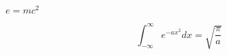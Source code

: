 \documentclass[10pt]{book}
\begin{document}
\begin{mdSnippets}
\begin{mdInlineSnippet}[a42da9c575b4e6bcbde63bd2e43f6ce9]%
$e = mc^2$\end{mdInlineSnippet}%
\begin{mdDisplaySnippet}[5094bc6c72a97e9f9f69ae85f34ed065]%
\[%
\int_{-\infty}^\infty e^{-a x^2} d x = \sqrt{\frac{\pi}{a}} 
\]%
\end{mdDisplaySnippet}%

\end{mdSnippets}
\end{document}
